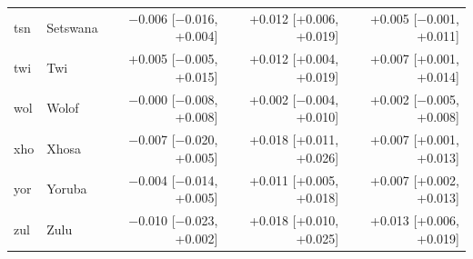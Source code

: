 {\begin{longtable}{@{}llrrr@{}}
tsn & Setswana & $-$0.006 [$-$0.016, +0.004] & +0.012 [+0.006, +0.019] & +0.005 [$-$0.001, +0.011] \\
twi & Twi & +0.005 [$-$0.005, +0.015] & +0.012 [+0.004, +0.019] & +0.007 [+0.001, +0.014] \\
wol & Wolof & $-$0.000 [$-$0.008, +0.008] & +0.002 [$-$0.004, +0.010] & +0.002 [$-$0.005, +0.008] \\
xho & Xhosa & $-$0.007 [$-$0.020, +0.005] & +0.018 [+0.011, +0.026] & +0.007 [+0.001, +0.013] \\
yor & Yoruba & $-$0.004 [$-$0.014, +0.005] & +0.011 [+0.005, +0.018] & +0.007 [+0.002, +0.013] \\
zul & Zulu & $-$0.010 [$-$0.023, +0.002] & +0.018 [+0.010, +0.025] & +0.013 [+0.006, +0.019] \\
\end{longtable}}
